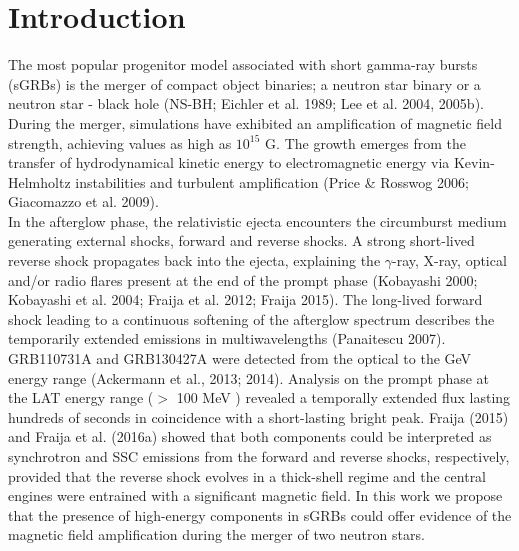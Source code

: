 \documentclass[11pt,twoside]{article}
\begin{document}
\section{Introduction}
%
%
The most popular progenitor model associated with short gamma-ray bursts (sGRBs) is the merger of compact object binaries; a neutron star binary  or a neutron star - black hole (NS-BH; Eichler et al. 1989; Lee et al. 2004, 2005b).   During the merger, simulations have exhibited an amplification of magnetic field strength,  achieving values as high as $10^{15}$ G.  The growth emerges from the transfer of hydrodynamical kinetic energy to electromagnetic energy via Kevin-Helmholtz instabilities and turbulent amplification (Price \& Rosswog 2006; Giacomazzo et al. 2009).\\
%
In the afterglow phase, the relativistic ejecta encounters the circumburst medium generating external shocks, forward and reverse shocks.  A strong short-lived reverse shock propagates back into the ejecta, explaining the $\gamma$-ray, X-ray, optical and/or radio flares present at the end of the prompt phase (Kobayashi 2000; Kobayashi et al. 2004; Fraija et al. 2012; Fraija 2015).   The long-lived forward shock leading to a continuous softening of the afterglow spectrum describes the temporarily extended emissions in multiwavelengths (Panaitescu 2007).\\ 
%
GRB110731A and GRB130427A were detected from the optical to the GeV energy range (Ackermann et al., 2013; 2014). Analysis on the prompt phase at the LAT energy range ($>$ 100 MeV )  revealed a temporally extended flux lasting hundreds of seconds in coincidence with a short-lasting bright peak.  Fraija (2015) and Fraija et al. (2016a) showed that both components could be interpreted as synchrotron and SSC emissions from the forward and reverse shocks, respectively, provided that  the reverse shock evolves in a thick-shell regime and the central engines were entrained with a significant magnetic field. In this work we propose that the presence of high-energy components in sGRBs could offer evidence of the magnetic field amplification during the merger of two neutron stars.
%
%
\end{document}
